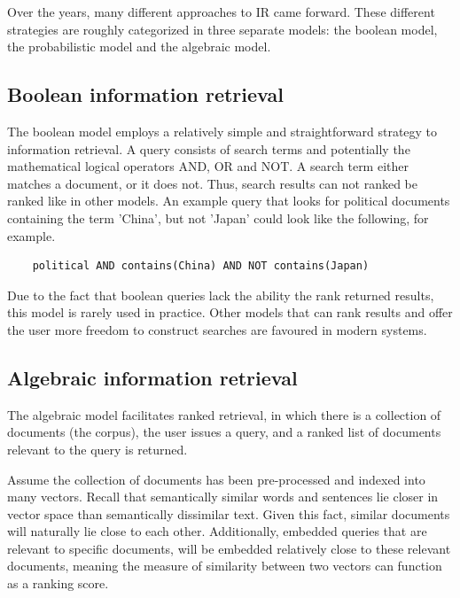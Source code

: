 \documentclass[twoside]{uva-inf-bachelor-thesis}
\begin{document}
Over the years, many different approaches to IR came forward. These different strategies are roughly categorized in three separate models: the boolean model, the probabilistic model and the algebraic model. \cite{goker2009information}

\subsection{Boolean information retrieval}
The boolean model employs a relatively simple and straightforward strategy to information retrieval. A query consists of search terms and potentially the mathematical logical operators AND, OR and NOT. A search term either matches a document, or it does not. Thus, search results can not ranked be ranked like in other models.\cite{goker2009information, manning08IR} An example query that looks for political documents containing the term 'China', but not 'Japan' could look like the following, for example.
\begin{verbatim}
    political AND contains(China) AND NOT contains(Japan)
\end{verbatim}
Due to the fact that boolean queries lack the ability the rank returned results, this model is rarely used in practice. Other models that can rank results and offer the user more freedom to construct searches are favoured in modern systems.

\subsection{Algebraic information retrieval}
The algebraic model facilitates ranked retrieval, in which there is a collection of documents (the corpus), the user issues a query, and a ranked list of documents relevant to the query is returned.

Assume the collection of documents has been pre-processed and indexed into many vectors. Recall that semantically similar words and sentences lie closer in vector space than semantically dissimilar text. Given this fact, similar documents will naturally lie close to each other. Additionally, embedded queries that are relevant to specific documents, will be embedded relatively close to these relevant documents, meaning the measure of similarity between two vectors can function as a ranking score.
\end{document}
